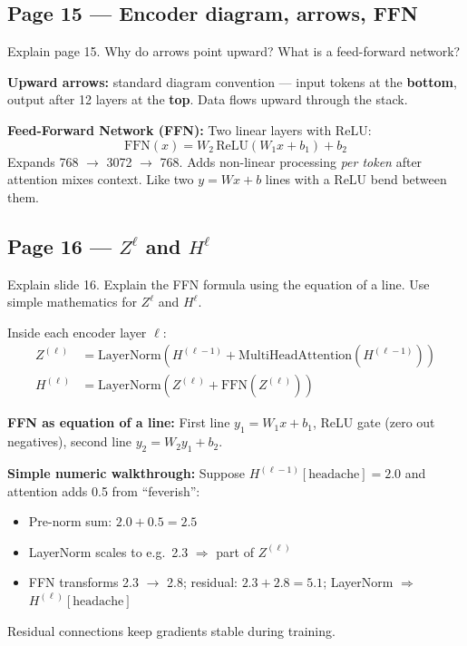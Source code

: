 \documentclass[11pt]{article}
\begin{document}
\subsection{Page 15 --- Encoder diagram, arrows, FFN}

\begin{questionbox}
Explain page 15. Why do arrows point upward? What is a feed-forward network?
\end{questionbox}

\begin{answerbox}
\textbf{Upward arrows:} standard diagram convention --- input tokens at the \textbf{bottom}, output after 12 layers at the \textbf{top}. Data flows upward through the stack.

\textbf{Feed-Forward Network (FFN):} Two linear layers with ReLU:
\[
\mathrm{FFN}(x) = W_2\,\mathrm{ReLU}(W_1 x + b_1) + b_2
\]
Expands 768 $\to$ 3072 $\to$ 768. Adds non-linear processing \textit{per token} after attention mixes context. Like two $y = Wx + b$ lines with a ReLU bend between them.
\end{answerbox}

\subsection{Page 16 --- $Z^\ell$ and $H^\ell$}

\begin{questionbox}
Explain slide 16. Explain the FFN formula using the equation of a line. Use simple mathematics for $Z^\ell$ and $H^\ell$.
\end{questionbox}

\begin{answerbox}
Inside each encoder layer $\ell$:
\begin{align*}
Z^{(\ell)} &= \mathrm{LayerNorm}\!\left(H^{(\ell-1)} + \mathrm{MultiHeadAttention}(H^{(\ell-1)})\right) \\
H^{(\ell)} &= \mathrm{LayerNorm}\!\left(Z^{(\ell)} + \mathrm{FFN}(Z^{(\ell)})\right)
\end{align*}

\textbf{FFN as equation of a line:} First line $y_1 = W_1 x + b_1$, ReLU gate (zero out negatives), second line $y_2 = W_2 y_1 + b_2$.

\textbf{Simple numeric walkthrough:} Suppose $H^{(\ell-1)}[\text{headache}] = 2.0$ and attention adds 0.5 from ``feverish'':
\begin{itemize}
  \item Pre-norm sum: $2.0 + 0.5 = 2.5$
  \item LayerNorm scales to e.g.\ 2.3 $\Rightarrow$ part of $Z^{(\ell)}$
  \item FFN transforms 2.3 $\to$ 2.8; residual: $2.3 + 2.8 = 5.1$; LayerNorm $\Rightarrow$ $H^{(\ell)}[\text{headache}]$
\end{itemize}
Residual connections keep gradients stable during training.
\end{answerbox}
\end{document}

